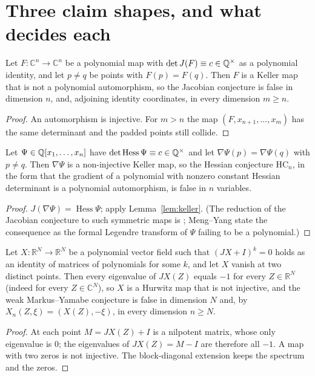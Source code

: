 \documentclass[11pt]{article}
\newcommand{\C}{\mathbb{C}}
\newcommand{\Hess}{\operatorname{Hess}}
\begin{document}
\section{Three claim shapes, and what decides each}\label{sec:shapes}

\begin{lemma}\label{lem:keller}
Let $F\colon\C^n\to\C^n$ be a polynomial map with $\det J(F)\equiv c\in\mathbb{Q}^\times$ as a
polynomial identity, and let $p\neq q$ be points with $F(p)=F(q)$. Then $F$ is a Keller map that
is not a polynomial automorphism, so the Jacobian conjecture is false in dimension $n$, and,
adjoining identity coordinates, in every dimension $m\ge n$.
\end{lemma}
\begin{proof}
An automorphism is injective. For $m>n$ the map $(F,x_{n+1},\dots,x_m)$ has the same
determinant and the padded points still collide.
\end{proof}

\begin{lemma}\label{lem:hess}
Let $\Psi\in\mathbb{Q}[x_1,\dots,x_n]$ have $\det\Hess\Psi\equiv c\in\Q^\times$ and let
$\nabla\Psi(p)=\nabla\Psi(q)$ with $p\neq q$. Then $\nabla\Psi$ is a non-injective Keller map,
so the Hessian conjecture $\mathrm{HC}_n$, in the form that the gradient of a polynomial with
nonzero constant Hessian determinant is a polynomial automorphism, is false in $n$ variables.
\end{lemma}
\begin{proof}
$J(\nabla\Psi)=\Hess\Psi$; apply Lemma~\ref{lem:keller}. (The reduction of the Jacobian
conjecture to such symmetric maps is \cite{dBE2005}; Meng--Yang state the consequence as the
formal Legendre transform of $\Psi$ failing to be a polynomial.)
\end{proof}

\begin{lemma}\label{lem:my}
Let $X\colon\mathbb{R}^N\to\mathbb{R}^N$ be a polynomial vector field such that
$(JX+I)^k=0$ holds as an identity of matrices of polynomials for some $k$, and let $X$ vanish
at two distinct points. Then every eigenvalue of $JX(Z)$ equals $-1$ for every $Z\in\mathbb{R}^N$
(indeed for every $Z\in\C^N$), so $X$ is a Hurwitz map that is not injective, and the weak
Markus--Yamabe conjecture is false in dimension $N$ and, by $X_n(Z,\xi)=(X(Z),-\xi)$, in every
dimension $n\ge N$.
\end{lemma}
\begin{proof}
At each point $M=JX(Z)+I$ is a nilpotent matrix, whose only eigenvalue is $0$; the eigenvalues
of $JX(Z)=M-I$ are therefore all $-1$. A map with two zeros is not injective. The block-diagonal
extension keeps the spectrum and the zeros.
\end{proof}
\end{document}
